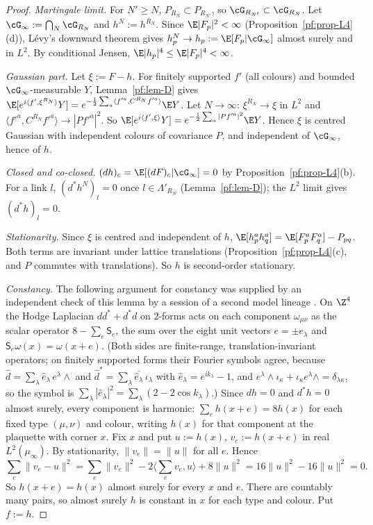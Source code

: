 \begin{proof}
\emph{Martingale limit.} For $N'\ge N$, $P_{R_N}\subset P_{R_{N'}}$, so $\cG_{R_{N'}}\subset\cG_{R_N}$. Let $\cG_\infty:=\bigcap_N\cG_{R_N}$ and $h^N:=h^{R_N}$. Since $\E|F_p|^2<\infty$ (Proposition~\ref{pf:prop-L4}(d)), L\'evy's downward theorem gives $h^N_p\to h_p:=\E[F_p|\cG_\infty]$ almost surely and in $L^2$. By conditional Jensen, $\E|h_p|^4\le\E|F_p|^4<\infty$.

\emph{Gaussian part.} Let $\xi:=F-h$. For finitely supported $f'$ (all colours) and bounded $\cG_\infty$-measurable $Y$, Lemma~\ref{pf:lem-D} gives $\E[e^{i\langle f',\xi^{R_N}\rangle}Y]=e^{-\frac12\sum_a\langle f'^a,C^{R_N}f'^a\rangle}\E Y$. Let $N\to\infty$: $\xi^{R_N}\to\xi$ in $L^2$ and $\langle f'^a,C^{R_N}f'^a\rangle\to|Pf'^a|^2$. So $\E[e^{i\langle f',\xi\rangle}Y]=e^{-\frac12\sum_a|Pf'^a|^2}\E Y$. Hence $\xi$ is centred Gaussian with independent colours of covariance $P$, and independent of $\cG_\infty$, hence of $h$.

\emph{Closed and co-closed.} $(dh)_c=\E[(dF)_c|\cG_\infty]=0$ by Proposition~\ref{pf:prop-L4}(b). For a link $l$, $(d^*h^{N})_l=0$ once $l\in\Lambda'_{R_N}$ (Lemma~\ref{pf:lem-D}); the $L^2$ limit gives $(d^*h)_l=0$.

\emph{Stationarity.} Since $\xi$ is centred and independent of $h$, $\E[h^a_ph^a_q]=\E[F^a_pF^a_q]-P_{pq}$. Both terms are invariant under lattice translations (Proposition~\ref{pf:prop-L4}(c), and $P$ commutes with translations). So $h$ is second-order stationary.

\emph{Constancy.} The following argument for constancy was supplied by an independent check of this lemma by a session of a second model lineage \cite[comment 7102490558]{RepoThread}. On $\Z^4$ the Hodge Laplacian $dd^*+d^*d$ on $2$-forms acts on each component $\omega_{\mu\nu}$ as the scalar operator $8-\sum_{e}\mathsf S_e$, the sum over the eight unit vectors $e=\pm e_\lambda$ and $\mathsf S_e\omega(x)=\omega(x+e)$. (Both sides are finite-range, translation-invariant operators; on finitely supported forms their Fourier symbols agree, because $\hat d=\sum_\lambda\hat e_\lambda\,e^\lambda\wedge$ and $\hat d^*=\sum_\lambda\overline{\hat e_\lambda}\,\iota_\lambda$ with $\hat e_\lambda=e^{ik_\lambda}-1$, and $e^\lambda\wedge\iota_\kappa+\iota_\kappa e^\lambda\wedge=\delta_{\lambda\kappa}$, so the symbol is $\sum_\lambda|\hat e_\lambda|^2=\sum_\lambda(2-2\cos k_\lambda)$.) Since $dh=0$ and $d^*h=0$ almost surely, every component is harmonic: $\sum_eh(x+e)=8h(x)$ for each fixed type $(\mu,\nu)$ and colour, writing $h(x)$ for that component at the plaquette with corner $x$. Fix $x$ and put $u:=h(x)$, $v_e:=h(x+e)$ in real $L^2(\mu_\infty)$. By stationarity, $\|v_e\|=\|u\|$ for all $e$. Hence
\[
\sum_e\|v_e-u\|^2=\sum_e\|v_e\|^2-2\Big\langle\sum_ev_e,u\Big\rangle+8\|u\|^2=16\|u\|^2-16\|u\|^2=0 .
\]
So $h(x+e)=h(x)$ almost surely for every $x$ and $e$. There are countably many pairs, so almost surely $h$ is constant in $x$ for each type and colour. Put $f:=h$.
\end{proof}

